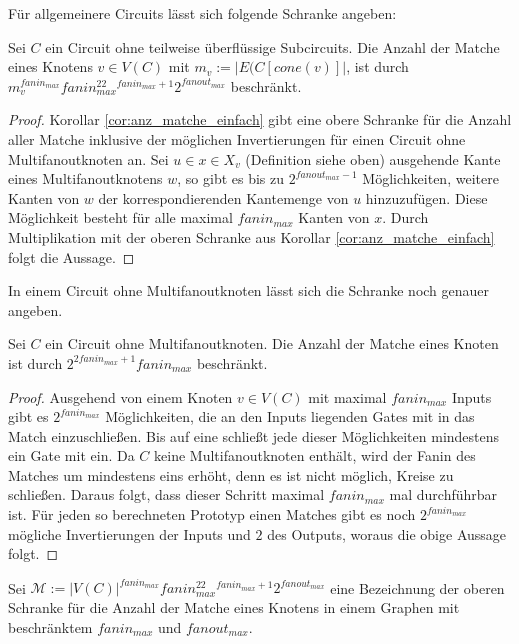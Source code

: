 \documentclass[11pt, a4paper, german]{article}
\begin{document}
Für allgemeinere Circuits lässt sich folgende Schranke angeben: 
\begin{cor}\label{cor:anzahl_matche_bel}
Sei $C$ ein Circuit ohne teilweise überflüssige Subcircuits. Die Anzahl der Matche eines Knotens $v\in V(C)$ mit $m_v := |E(C[cone(v)]|$, ist durch \\ $m_v^{fanin_{max}} fanin_{max}^22^{fanin_{max}+1}2^{fanout_{max}}$ beschränkt.
\end{cor}
\begin{proof}
Korollar \ref{cor:anz_matche_einfach} gibt eine obere Schranke für die Anzahl aller Matche inklusive der möglichen Invertierungen für einen Circuit ohne Multifanoutknoten an. Sei $u \in x \in X_v$ (Definition siehe oben) ausgehende Kante eines Multifanoutknotens $w$, so gibt es bis zu $2^{fanout_{max}-1}$ Möglichkeiten, weitere Kanten von $w$ der korrespondierenden Kantemenge von $u$ hinzuzufügen.  Diese Möglichkeit besteht für alle maximal $fanin_{max}$ Kanten von $x$. Durch Multiplikation mit der oberen Schranke aus Korollar \ref{cor:anz_matche_einfach} folgt die Aussage.
\end{proof}
In einem Circuit ohne Multifanoutknoten lässt sich die Schranke noch genauer angeben. 
\begin{cor}\label{cor:anz_matche_einfach_genauer}
Sei $C$ ein Circuit ohne Multifanoutknoten. Die Anzahl der Matche eines Knoten ist durch $2^{2fanin_{max} +1}fanin_{max}$ beschränkt.
\end{cor}
\begin{proof}
Ausgehend von einem Knoten $v \in V(C)$ mit maximal $fanin_{max}$ Inputs gibt es  $2^{fanin_{max}}$ Möglichkeiten, die an den Inputs liegenden Gates mit in das Match einzuschließen. Bis auf eine schließt jede dieser Möglichkeiten mindestens ein Gate mit ein. Da $C$ keine Multifanoutknoten enthält, wird der Fanin des Matches um mindestens eins erhöht, denn es ist nicht möglich, Kreise zu schließen. Daraus folgt, dass dieser Schritt maximal $fanin_{max}$ mal durchführbar ist. Für jeden so berechneten Prototyp einen Matches gibt es noch $2^{fanin_{max}}$ mögliche Invertierungen der Inputs und $2$ des Outputs, woraus die obige Aussage folgt.
\end{proof}
\begin{definition}
Sei $\mathcal{M}:= |V(C)|^{fanin_{max}} fanin_{max}^22^{fanin_{max}+1}2^{fanout_{max}}$ eine Bezeichnung der oberen Schranke für die Anzahl der Matche eines Knotens in einem Graphen mit beschränktem $fanin_{max}$ und $fanout_{max}$.
\end{definition}
\end{document}
